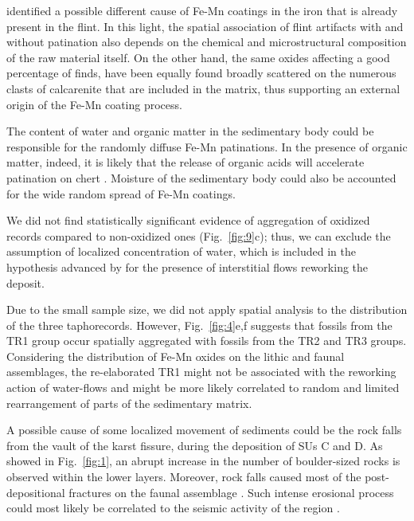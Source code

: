 \documentclass[review,authoryear]{elsarticle} %
\begin{document}
\citet{Rottlander1975} identified a possible different cause of Fe-Mn coatings in the iron that is already present in the flint. In this light, the spatial association of flint artifacts with and without patination also depends on the chemical and microstructural composition of the raw material itself. On the other hand, the same oxides affecting a good percentage of finds, have been equally found broadly scattered on the numerous clasts of calcarenite that are included in the matrix, thus supporting an external origin of the Fe-Mn coating process.

The content of water and organic matter in the sedimentary body could be responsible for the randomly diffuse Fe-Mn patinations. In the presence of organic matter, indeed, it is likely that the release of organic acids will accelerate patination on chert \citep{Burroni2002}. Moisture of the sedimentary body could also be accounted for the wide random spread of Fe-Mn coatings.

We did not find statistically significant evidence of aggregation of oxidized records compared to non-oxidized ones (Fig.~\ref{fig:9}c); thus, we can exclude the assumption of localized concentration of water, which is included in the hypothesis advanced by \citet{Bagnus2011} for the presence of interstitial flows reworking the deposit.

Due to the small sample size, we did not apply spatial analysis to the distribution of the three taphorecords. However, Fig.~\ref{fig:4}e,f suggests that fossils from the TR1 group occur spatially aggregated with fossils from the TR2 and TR3 groups. Considering the distribution of Fe-Mn oxides on the lithic and faunal assemblages, the re-elaborated TR1 \citep[\emph{sensu}][]{Fernandez-Lopez1991,Fernandez-Lopez2007,Fernandez-Lopez2011} might not be associated with the reworking action of water-flows and might be more likely correlated to random and limited rearrangement of parts of the sedimentary matrix.

A possible cause of some localized movement of sediments could be the rock falls from the vault of the karst fissure, during the deposition of SUs C and D. As showed in Fig.~\ref{fig:1}, an abrupt increase in the number of boulder-sized rocks is observed within the lower layers. Moreover, rock falls caused most of the post-depositional fractures on the faunal assemblage \citep{Bagnus2011}. Such intense erosional process could most likely be correlated to the seismic activity of the region \citep{Bertok2013}.
\end{document}
